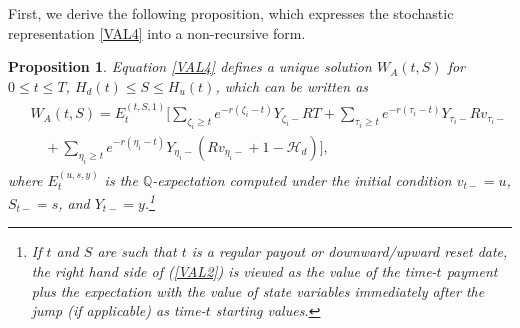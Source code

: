 \documentclass[11pt]{article}%
\numberwithin{equation}{section}
\theoremstyle{plain}
\newtheorem{proposition}{Proposition}
\begin{document}
\begin{appendices}
First, we derive the following proposition, which expresses the stochastic representation \eqref{VAL4} into a non-recursive form.
\begin{proposition}\label{prop:nonrecur}
	Equation \eqref{VAL4} defines a unique solution $W_A(t,S)$ for $0\le t\le T$, $H_d(t)\le S\le H_u(t)$, which can be written as
	\begin{align}\label{VALnonrecur}
	\begin{split}
	&W_A(t,S)=E_t^{(t,S,1)}\Bigg[\sum_{\zeta_i\ge t}e^{-r(\zeta_i-t)}Y_{\zeta_i-}RT+\sum_{\tau_i\ge t}e^{-r(\tau_i-t)}Y_{\tau_i-}Rv_{\tau_i-}\\
	&\quad+\sum_{\eta_i\ge t}e^{-r(\eta_i-t)}Y_{\eta_i-}(Rv_{\eta_i-}+1-\mathcal{H}_d)\Bigg],
	\end{split}
	\end{align}
	where $E^{(u,s,y)}_t$ is the $\mathbb{Q}$-expectation computed under the initial condition $v_{t-}=u$, $S_{t-}=s$, and $Y_{t-}=y$.\footnote{If $t$ and $S$ are such that $t$ is a regular payout or downward/upward reset date, the right hand side of (\ref{VAL2}) is viewed as the value of the time-$t$ payment plus the expectation with the value of state variables immediately after the jump (if applicable) as time-$t$ starting values.}
\end{proposition}


\end{appendices}
\end{document}
